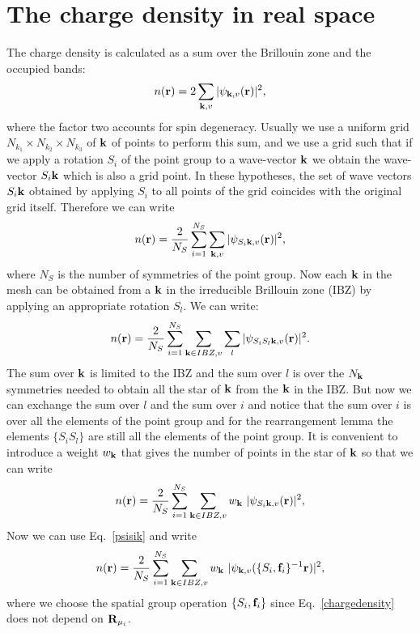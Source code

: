 \documentclass[12pt,a4paper,twoside]{report}
\begin{document}
\section{The charge density in real space}

The charge density is calculated as a sum over the
Brillouin zone and the occupied bands:
\begin{equation}
n({\bf r}) = 2 \sum_{{\bf k}, v} |\psi_{{\bf k}, v} ({\bf r}) |^2,
\end{equation}
where the factor two accounts for spin degeneracy.
Usually we use a uniform grid $N_{k_1}\times N_{k_2} \times N_{k_3}$ of ${\bf k}$ of points to perform this sum, and we use a grid such that if we apply a rotation $S_i$ of the point group to a wave-vector ${\bf k}$ we obtain the wave-vector $S_i {\bf k}$ which is also a grid point. 
In these hypotheses, the set of wave vectors $S_i {\bf k}$ obtained by applying $S_i$ to all points of the grid
coincides with the original grid itself. Therefore we 
can write 
\begin{equation}
n({\bf r}) = {2 \over N_S} \sum_{i=1}^{N_S} \sum_{{\bf k}, v} |\psi_{S_i{\bf k}, v} ({\bf r}) |^2,
\end{equation}
where $N_S$ is the number of symmetries of the point group. Now each ${\bf k}$ in the mesh can be obtained from a ${\bf k}$ in the irreducible Brillouin zone (IBZ) by applying an appropriate rotation $S_l$.
We can write:
\begin{equation}
n({\bf r}) = {2 \over N_S} \sum_{i=1}^{N_S} \sum_{{\bf k} \in IBZ, v} \sum_l |\psi_{S_iS_l{\bf k}, v} ({\bf r}) |^2.
\end{equation}
The sum over ${\bf k}$ is limited to the IBZ and the sum over $l$ is over the $N_{\bf k}$ symmetries needed to obtain all the star of ${\bf k}$ from the 
${\bf k}$ in the IBZ. But now we can exchange the sum over $l$ and the sum over $i$ and notice that the sum over $i$ is over all the elements of the point group and for the rearrangement lemma the elements $\{ S_i S_l\}$ are still all the elements of the point group. It is convenient to introduce
a weight $w_{\bf k}$ that gives the number of points in the star of ${\bf k}$ so that we can write
\begin{equation}
n({\bf r}) = {2 \over N_S} \sum_{i=1}^{N_S}  \sum_{{\bf k} \in IBZ, v} w_{\bf k}\ |\psi_{S_i{\bf k}, v} ({\bf r}) |^2,
\end{equation}
Now we can use Eq.~\ref{psisik} and write
\begin{equation}
n({\bf r}) = {2 \over N_S} \sum_{i=1}^{N_S} \sum_{{\bf k}\in IBZ , v} w_{\bf k}\ |\psi_{{\bf k}, v} ( \{S_i,{\bf f}_i\}^{-1} {\bf r}) |^2,
\label{chargedensity}
\end{equation}
where we choose the spatial group operation $\{S_i,{\bf f}_i\}$ since Eq.~\ref{chargedensity} does not depend on
${\bf R}_{\mu_i}$.
\end{document}
